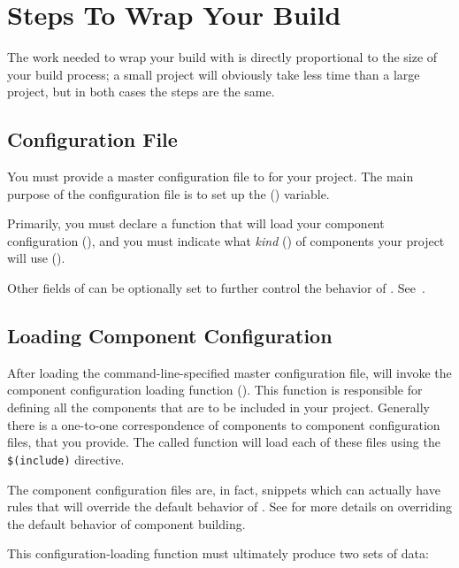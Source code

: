 \section{Steps To Wrap Your Build}

The work needed to wrap your build with \lmsbw is directly
proportional to the size of your build process; a small project will
obviously take less time than a large project, but in both cases the
steps are the same.

\subsection{Configuration File}

You must provide a master configuration file to \lmsbw for your
project.  The main purpose of the configuration file is to set up the
\lmsbwconfiguration () variable.

Primarily, you must declare a \gnumake function that will load your
component configuration
(), and you must indicate
what \emph{kind} () of components your project
will use ().

Other fields of \lmsbwconfiguration can be optionally set to further
control the behavior of \lmsbw.
See~.

\subsection{Loading Component Configuration}

After loading the command-line-specified master configuration file,
\lmsbw will invoke the component configuration loading function
().  This function is responsible
for defining all the components that are to be included in your
project.  Generally there is a one-to-one correspondence of components
to component configuration files, that you provide.  The called
function will load each of these files using the \gnumake
\texttt{\$(include)} directive.

The component configuration files are, in fact, \makefile snippets
which can actually have rules that will override the default behavior
of \lmsbw.  See  for more details on overriding
the default behavior of component building.

This configuration-loading function must ultimately produce two sets
of data:


